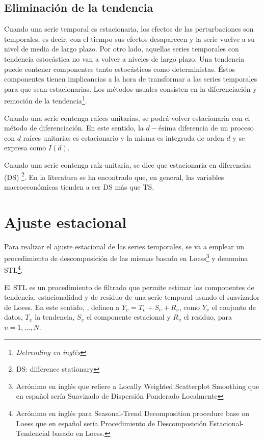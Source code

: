 \subsection{Eliminación de la tendencia}
 
Cuando una serie temporal es estacionaria, los efectos de las perturbaciones son temporales, es decir, con el tiempo sus efectos desaparecen y la serie vuelve a su nivel de media de largo plazo. Por otro lado, aquellas series temporales con tendencia estocástica no van a volver a niveles de largo plazo. Una tendencia puede contener componentes tanto estocásticos como deterministas. Éstos componentes tienen implicancias a la hora de transformar a las series temporales para que sean estacionarias. Los métodos usuales consisten en la diferenciación y remoción de la tendencia\footnote{\textit{Detrending en inglés}}.

Cuando una serie contenga raíces unitarias, se podrá volver estacionaria con el método de diferenciación. En este sentido, la $d-\text{ésima}$ diferencia de un proceso con $d$ raíces unitarias es estacionario y la misma es integrada de orden $d$ y se expresa como $I(d)$.

Cuando una serie contenga raíz unitaria, se dice que estacionaria en diferencias (DS) \footnote{DS: difference stationary}. En la literatura se ha encontrado que, en general, las variables macroeconómicas  tienden a ser DS más que TS.

\newpage
\section{Ajuste estacional}
\label{sec: sa}

Para realizar el ajuste estacional de las series temporales, se va a emplear un procedimiento de descomposición de las mismas basado en Loess\footnote{Acrónimo en inglés que refiere a Locally Weighted Scatterplot Smoothing que en español sería Suavizado de Dispersión Ponderado Localmente} y denomina STL\footnote{ Acrónimo en inglés para Seasonal-Trend Decomposition procedure base on Loess que en español sería Procedimiento de Descomposición Estacional-Tendencial basado en Loess.}. 

El STL es un procedimiento de filtrado que permite estimar los componentes de tendencia, estacionalidad y de residuo de una serie temporal usando el suavizador de Loess. En este sentido,  \citet{sampleRef}, definen a $Y_{\upsilon}=T_{\upsilon} + S_{\upsilon} + R_{\upsilon}$, como $Y_{\upsilon}$ el conjunto de datos, $T_{\upsilon}$ la tendencia, $S_{\upsilon}$ el componente estacional y $R_{\upsilon}$ el residuo, para $\upsilon=1,...,N$. 

